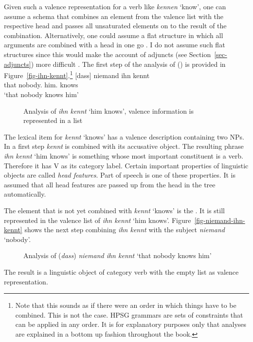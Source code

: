Given such a valence representation for a verb like \emph{kennen} `know', one can assume a schema
that combines an element from the valence list with the respective head and passes all unsaturated
elements on to the result of the combination. Alternatively, one could assume a flat structure in
which all arguments are combined with a head in one go \parencites[34]{GSag2000a-u}[Section~3]{MuellerOrder}. I do not assume such flat structures since
this would make the account of adjuncts (see Section~\ref{sec-adjuncts}) more difficult \citep[377--378]{MuellerOrder}.
The first step of the analysis of () is
provided in Figure~\vref{fig-ihn-kennt}.\footnote{%
  Note that this sounds as if there were an order in which things have to be combined. This is not
  the case. HPSG grammars are sets of constraints that can be applied in any order. It is for
  explanatory purposes only that analyses are explained in a bottom up fashion throughout the book.%
}
\ea
\label{ex-dass-niemand-ihn-kennt}
\gll  {}[dass] niemand ihn kennt\\
      \spacebr{}that nobody.\NOM{} him.\ACC{} knows\\ 
\glt `that nobody knows him'
\z
\begin{figure}
\centerfit{%
\begin{forest}
sm edges
[{V \sliste{ NP[\type{nom}] } }
  [{NP[\type{acc}]} [ihn;him] ]
  [{V \sliste{ NP[\type{nom}], NP[\type{acc}] }} [kennt;knows]] ] ]
\end{forest}}
\caption{\label{fig-ihn-kennt}Analysis of \emph{ihn kennt} `him knows', valence information is represented in a list}
\end{figure}
The lexical item for \emph{kennt} `knows' has a valence description containing two NPs. In a first
step \emph{kennt} is combined with its accusative object. The resulting phrase \emph{ihn kennt} `him
knows' is something whose most important constituent is a verb. Therefore it has V as its category
label. Certain important properties of linguistic objects are called \emph{head features}. Part of speech
is one of these properties. It is assumed that all head features are passed up from the head in the tree
automatically.

The element that is not yet combined with \emph{kennt} `knows' is the \npnom. It is still
represented in the valence list of \emph{ihn kennt} `him knows'. Figure~\vref{fig-niemand-ihn-kennt}
shows the next step combining \emph{ihn kennt} with the subject \emph{niemand} `nobody'.
\begin{figure}
\caption{\label{fig-niemand-ihn-kennt}Analysis of (\emph{dass}) \emph{niemand ihn kennt} `that nobody
  knows him'}
\end{figure}
The result is a linguistic object of category verb with the empty list as valence representation.

